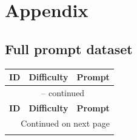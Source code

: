 \appendix
\section*{Appendix}
\label{sec:appendix}


\subsection*{Full prompt dataset}
\label{sec:appendix-prompts}

\begin{longtable}{@{} l l p{13cm} @{}}                                                                                                                  \\
	\toprule
	\textbf{ID} & \textbf{Difficulty} & \textbf{Prompt}                                                                                    \\
	\midrule
	\endfirsthead

	\multicolumn{3}{c}{\tablename\ \thetable{} -- continued}                                                                               \\
	\toprule
	\textbf{ID} & \textbf{Difficulty} & \textbf{Prompt}                                                                                    \\
	\midrule
	\endhead

	\midrule
	\multicolumn{3}{r}{Continued on next page}                                                                                             \\
	\endfoot

	\bottomrule
	\endlastfoot


\end{longtable}

